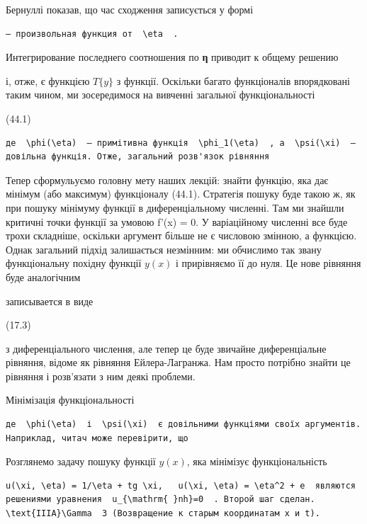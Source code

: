 \documentclass[
  ukrainian,
]{article}
\begin{document}
Бернуллі показав, що час сходження записується у формі

\begin{verbatim}
— произвольная функция от  \eta  .
\end{verbatim}

Интегрирование последнего соотношения по \textbf{η} приводит к общему
решению

і, отже, є функцією \(T\{y\}\) з функції. Оскільки багато функціоналів
впорядковані таким чином, ми зосередимося на вивченні загальної
функціональності

(44.1)

\begin{verbatim}
де  \phi(\eta)  — примітивна функція  \phi_1(\eta)  , а  \psi(\xi)  — довільна функція. Отже, загальний розв'язок рівняння
\end{verbatim}

Тепер сформульуємо головну мету наших лекцій: знайти функцію, яка дає
мінімум (або максимум) функціоналу (44.1). Стратегія пошуку буде такою
ж, як при пошуку мінімуму функції в диференціальному численні. Там ми
знайшли критичні точки функції за умовою f'(x) = 0. У варіаційному
численні все буде трохи складніше, оскільки аргумент більше не є
числовою змінною, а функцією. Однак загальний підхід залишається
незмінним: ми обчислимо так звану функціональну похідну функції \(y(x)\)
і прирівняємо її до нуля. Це нове рівняння буде аналогічним

записывается в виде

(17.3)

з диференціального числення, але тепер це буде звичайне диференціальне
рівняння, відоме як рівняння Ейлера-Лагранжа. Нам просто потрібно знайти
це рівняння і розв'язати з ним деякі проблеми.

Мінімізація функціональності

\begin{verbatim}
де  \phi(\eta)  і  \psi(\xi)  є довільними функціями своїх аргументів. Наприклад, читач може перевірити, що
\end{verbatim}

Розглянемо задачу пошуку функції \(y(x)\), яка мінімізує
функціональність

\begin{verbatim}
u(\xi, \eta) = 1/\eta + tg \xi,   u(\xi, \eta) = \eta^2 + e  являются решениями уравнения  u_{\mathrm{ }nh}=0  . Второй шаг сделан.  \text{IIIA}\Gamma  3 (Возвращение к старым координатам x и t).
\end{verbatim}
\end{document}
